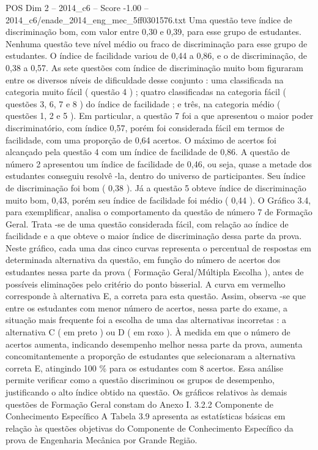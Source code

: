 \begin{textsample}{POS Dim 2 – 2014\_c6 – Score -1.00 – 2014\_c6/enade\_2014\_eng\_mec\_5ff0301576.txt}
Uma questão teve índice de discriminação bom, com valor entre 0,30 e 0,39, para esse grupo de estudantes.
Nenhuma questão teve nível médio ou fraco de discriminação para esse grupo de estudantes.
O índice de facilidade variou de 0,44 a 0,86, e o de discriminação, de 0,38 a 0,57.
As sete questões com índice de discriminação muito bom figuraram entre os diversos níveis de dificuldade desse conjunto : uma classificada na categoria muito fácil ( questão 4 ) ; quatro classificadas na categoria fácil ( questões 3, 6, 7 e 8 ) do índice de facilidade ; e três, na categoria médio ( questões 1, 2 e 5 ).
Em particular, a questão 7 foi a que apresentou o maior poder discriminatório, com índice 0,57, porém foi considerada fácil em termos de facilidade, com uma proporção de 0,64 acertos.
O máximo de acertos foi alcançado pela questão 4 com um índice de facilidade de 0,86.
A questão de número 2 apresentou um índice de facilidade de 0,46, ou seja, quase a metade dos estudantes conseguiu resolvê -la, dentro do universo de participantes.
Seu índice de discriminação foi bom ( 0,38 ).
Já a questão 5 obteve índice de discriminação muito bom, 0,43, porém seu índice de facilidade foi médio ( 0,44 ).
O Gráfico 3.4, para exemplificar, analisa o comportamento da questão de número 7 de Formação Geral.
Trata -se de uma questão considerada fácil, com relação ao índice de facilidade e a que obteve o maior índice de discriminação dessa parte da prova.
Neste gráfico, cada uma das cinco curvas representa o percentual de respostas em determinada alternativa da questão, em função do número de acertos dos estudantes nessa parte da prova ( Formação Geral/Múltipla Escolha ), antes de possíveis eliminações pelo critério do ponto bisserial.
A curva em vermelho corresponde à alternativa E, a correta para esta questão.
Assim, observa -se que entre os estudantes com menor número de acertos, nessa parte do exame, a situação mais frequente foi a escolha de uma das alternativas incorretas : a alternativa C ( em preto ) ou D ( em roxo ).
À medida em que o número de acertos aumenta, indicando desempenho melhor nessa parte da prova, aumenta concomitantemente a proporção de estudantes que selecionaram a alternativa correta E, atingindo 100 \% para os estudantes com 8 acertos.
Essa análise permite verificar como a questão discriminou os grupos de desempenho, justificando o alto índice obtido na questão.
Os gráficos relativos às demais questões de Formação Geral constam do Anexo I. 3.2.2 Componente de Conhecimento Específico A Tabela 3.9 apresenta as estatísticas básicas em relação às questões objetivas do Componente de Conhecimento Específico da prova de Engenharia Mecânica por Grande Região.

\end{textsample}
